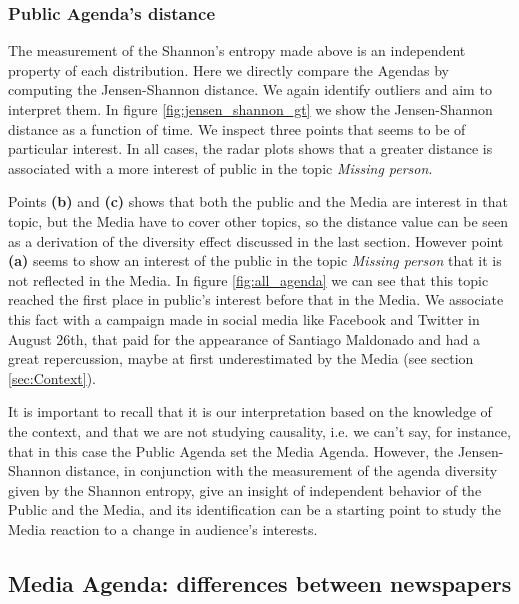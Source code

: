 \documentclass{bmcart}
\begin{document}
\subsubsection*{Public Agenda's distance}


\par The measurement of the Shannon's entropy made above is an independent property of each distribution.
Here we directly compare the Agendas by computing the Jensen-Shannon distance. We again identify outliers and aim to interpret them.
In figure \ref{fig:jensen_shannon_gt} we show the Jensen-Shannon distance as a function of time. We inspect three points that seems to be of particular interest. In all cases, the radar plots shows that a greater distance is associated with a more interest of public in the topic \emph{Missing person}.
\par Points \textbf{(b)} and \textbf{(c)} shows that both the public and the Media are interest in that topic, but the Media have to cover other topics, so the distance value can be seen as a derivation of the diversity effect discussed in the last section.
However point \textbf{(a)} seems to show an interest of the public in the topic \emph{Missing person} that it is not reflected in the Media. In figure \ref{fig:all_agenda} we can see that this topic reached the first place in public's interest before that in the Media. We associate this fact with a campaign made in social media like Facebook and Twitter in August 26th, that paid for the appearance of Santiago Maldonado and had a great repercussion, maybe at first underestimated by the Media (see section \ref{sec:Context}).
\par It is important to recall that it is our interpretation based on the knowledge of the context, and that we are not studying causality, i.e. we can't say, for instance, that in this case the Public Agenda set the Media Agenda. However, the Jensen-Shannon distance, in conjunction with the measurement of the agenda diversity given by the Shannon entropy, give an insight of independent behavior of the Public and the Media, and its identification can be a starting point to study the Media reaction to a change in audience's interests.

\subsection*{Media Agenda: differences between newspapers}
\end{document}
